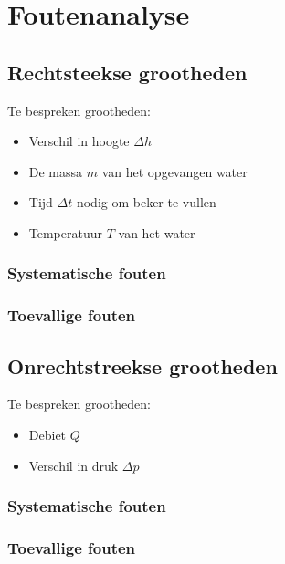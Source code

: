 \section{Foutenanalyse}

\subsection{Rechtsteekse grootheden}

Te bespreken grootheden:
\begin{itemize}
    \item Verschil in hoogte $\Delta h$
    \item De massa $m$ van het opgevangen water
    \item Tijd $\Delta t$ nodig om beker te vullen
    \item Temperatuur $T$ van het water
\end{itemize}

\subsubsection{Systematische fouten}



\subsubsection{Toevallige fouten}

\subsection{Onrechtstreekse grootheden}

Te bespreken grootheden:
\begin{itemize}
    \item Debiet $Q$
    \item Verschil in druk $\Delta p$
\end{itemize}

\subsubsection{Systematische fouten}
\subsubsection{Toevallige fouten}

